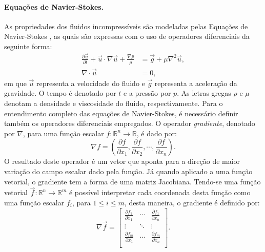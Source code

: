 \documentclass[12pt,a4paper,dvipsnames]{article}
\begin{document}
\paragraph{Equações de Navier-Stokes.} As propriedades dos fluidos incompressíveis são modeladas pelas Equações de Navier-Stokes \cite{malvern1969introduction}, as quais são expressas com o uso de operadores diferenciais da seguinte forma:
\begin{align}
    \frac{\partial \Vec{u}}{\partial t} + \Vec{u} \cdot \nabla \Vec{u} + \frac{\nabla p}{\rho} & = \Vec{g} + \mu \nabla^2 \Vec{u}, \label{eq:momentum}\\
    \nabla \cdot \Vec{u} & = 0, \label{eq:pressure}
\end{align}
em que $\Vec{u}$ representa a velocidade do fluido e $\Vec{g}$ representa a aceleração da gravidade. O tempo é denotado por $t$ e a pressão por $p$. As letras gregas $\rho$ e $\mu$ denotam a densidade e viscosidade do fluido, respectivamente. Para o entendimento completo das equações de Navier-Stokes, é necessário definir também os operadores diferenciais empregados. O operador \textit{gradiente}, denotado por $\nabla$, para uma função escalar $f: \mathbb{R}^n \to \mathbb{R}$, é dado por:
%
\begin{equation}
    \nabla f = \left(\frac{\partial f}{\partial x_1}, \frac{\partial f}{\partial x_2}, \cdots, \frac{\partial f}{\partial x_n} \right).
\end{equation}
O resultado deste operador é um vetor que aponta para a direção de maior variação do campo escalar dado pela função. Já quando aplicado a uma função vetorial, o gradiente tem a forma de uma matriz Jacobiana. Tendo-se uma função vetorial $\Vec{f}: \mathbb{R}^n \to \mathbb{R}^m$ é possível interpretar cada coordenada desta função como uma função escalar $f_i$, para $1 \leq i \leq m$, desta maneira, o gradiente é definido por:
%
\begin{equation}
    \nabla \Vec{f} =
    \begin{bmatrix}
    \frac{\partial f_1}{\partial x_1}  & \cdots & \frac{\partial f_1}{\partial x_n} \\
    \vdots & \ddots & \vdots \\
    \frac{\partial f_m}{\partial x_1}  & \cdots & \frac{\partial f_m}{\partial x_n} \\
    \end{bmatrix}.
\end{equation}
\end{document}
